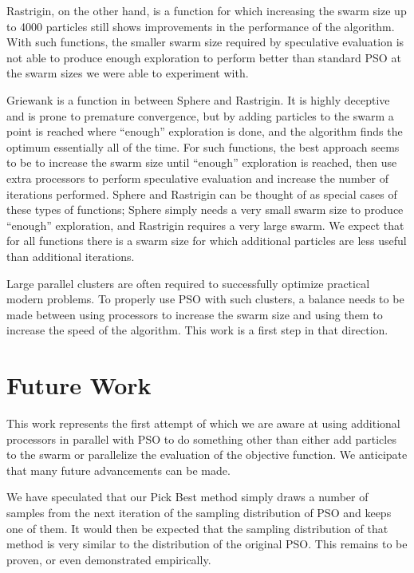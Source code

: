 \documentclass[journal,letterpaper]{IEEEtran}
\begin{document}
Rastrigin, on the other hand, is a function for which increasing the swarm size
up to 4000 particles still shows improvements in the performance of the
algorithm.  With such functions, the smaller swarm size required by speculative
evaluation is not able to produce enough exploration to perform better than
standard PSO at the swarm sizes we were able to experiment with.

Griewank is a function in between Sphere and Rastrigin.  It is highly deceptive
and is prone to premature convergence, but by adding particles to the swarm a
point is reached where ``enough'' exploration is done, and the algorithm finds
the optimum essentially all of the time.  For such functions, the best approach
seems to be to increase the swarm size until ``enough'' exploration is reached,
then use extra processors to perform speculative evaluation and increase the
number of iterations performed.  Sphere and Rastrigin can be thought of as
special cases of these types of functions; Sphere simply needs a very small
swarm size to produce ``enough'' exploration, and Rastrigin requires a very
large swarm.  We expect that for all functions there is a swarm size for which
additional particles are less useful than additional iterations.

Large parallel clusters are often required to successfully optimize practical
modern problems.  To properly use PSO with such clusters, a balance needs to be
made between using processors to increase the swarm size and using them to
increase the speed of the algorithm.  This work is a first step in that
direction.

\section{Future Work}
\label{sec:future}

This work represents the first attempt of which we are aware at using
additional processors in parallel with PSO to do something other than either
add particles to the swarm or parallelize the evaluation of the objective
function.  We anticipate that many future advancements can be made.

We have speculated that our Pick Best method simply draws a number of samples
from the next iteration of the sampling distribution of PSO and keeps one of
them.  It would then be expected that the sampling distribution of that method
is very similar to the distribution of the original PSO.  This remains to be
proven, or even demonstrated empirically.
\end{document}
